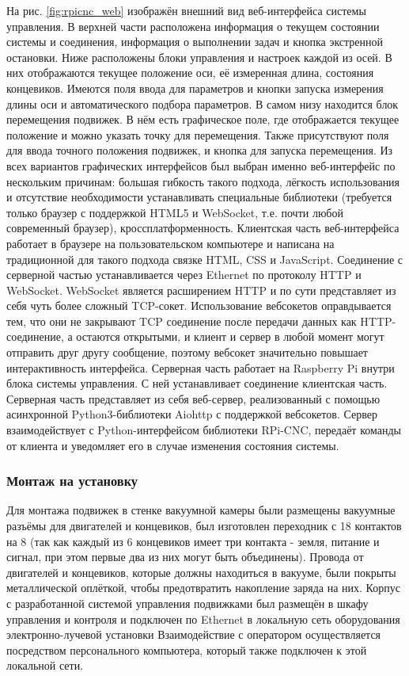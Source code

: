 \documentclass[14pt,russian,a4paper]{extarticle}
\begin{document}
На рис. \ref{fig:rpicnc_web} изображён внешний вид веб-интерфейса системы управления. В верхней части расположена информация о текущем состоянии системы и соединения, информация о выполнении задач и кнопка экстренной остановки. Ниже расположены блоки управления и настроек каждой из осей. В них отображаются текущее положение оси, её измеренная длина, состояния концевиков. Имеются поля ввода для параметров и кнопки запуска измерения длины оси и автоматического подбора параметров. В самом низу находится блок перемещения подвижек. В нём есть графическое поле, где отображается текущее положение и можно указать точку для перемещения. Также присутствуют поля для ввода точного положения подвижек, и кнопка для запуска перемещения.
\newline
Из всех вариантов графических интерфейсов был выбран именно веб-интерфейс по нескольким причинам: большая гибкость такого подхода, лёгкость использования и отсутствие необходимости устанавливать специальные библиотеки (требуется только браузер с поддержкой HTML5 и WebSocket, т.е. почти любой современный браузер), кроссплатформенность.
\newline
Клиентская часть веб-интерфейса работает в браузере на пользовательском компьютере и написана на традиционной для такого подхода связке HTML, CSS и JavaScript. Соединение с серверной частью устанавливается через Ethernet по протоколу HTTP и WebSocket. WebSocket является расширением HTTP и по сути представляет из себя чуть более сложный TCP-сокет. Использование вебсокетов оправдывается тем, что они не закрывают TCP соединение после передачи данных как HTTP-соединение, а остаются открытыми, и клиент и сервер в любой момент могут отправить друг другу сообщение, поэтому вебсокет значительно повышает интерактивность интерфейса.
\newline
Серверная часть работает на Raspberry Pi внутри блока системы управления. С ней устанавливает соединение клиентская часть. Серверная часть представляет из себя веб-сервер, реализованный с помощью асинхронной Python3-библиотеки Aiohttp с поддержкой вебсокетов. Сервер взаимодействует с Python-интерфейсом библиотеки RPi-CNC, передаёт команды от клиента и уведомляет его в случае изменения состояния системы.

\subsubsection{Монтаж на установку}
Для монтажа подвижек в стенке вакуумной камеры были размещены вакуумные разъёмы для двигателей и концевиков, был изготовлен переходник с 18 контактов на 8 (так как каждый из 6 концевиков имеет три контакта - земля, питание и сигнал, при этом первые два из них могут быть объединены). Провода от двигателей и концевиков, которые должны находиться в вакууме, были покрыты металлической оплёткой, чтобы предотвратить накопление заряда на них.
\newline
Корпус с разработанной системой управления подвижками был размещён в шкафу управления и контроля и подключен по Ethernet в локальную сеть оборудования электронно-лучевой установки Взаимодействие с оператором осуществляется посредством персонального компьютера, который также подключен к этой локальной сети.
\end{document}
